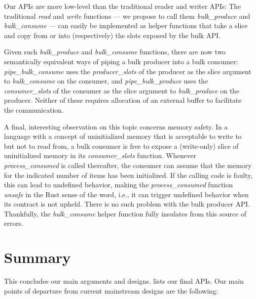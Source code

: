 \documentclass[sigplan,screen,10pt,review]{acmart}
\begin{document}
Our APIs are more low-level than the traditional reader and writer APIs: The traditional \textit{read} and \textit{write} functions --- we propose to call them \textit{bulk\_produce} and \textit{bulk\_consume} --- can easily be implemented as helper functions that take a slice and copy from or into (respectively) the slots exposed by the bulk API.

Given such \textit{bulk\_produce} and \textit{bulk\_consume} functions, there are now two semantically equivalent ways of piping a bulk producer into a bulk consumer: \textit{pipe\_bulk\_consume} uses the \textit{producer\_slots} of the producer as the slice argument to \textit{bulk\_consume} on the consumer, and \textit{pipe\_bulk\_produce} uses the \textit{consumer\_slots} of the consumer as the slice argument to \textit{bulk\_produce} on the producer. Neither of these requires allocation of an external buffer to facilitate the communication.

A final, interesting observation on this topic concerns memory safety. In a language with a concept of uninitialized memory that is acceptable to write to but not to read from, a bulk consumer is free to expose a (write-only) slice of uninitialized memory in its \textit{consumer\_slots} function. Whenever \textit{process\_consumed} is called thereafter, the consumer can assume that the memory for the indicated number of items has been initialized. If the calling code is faulty, this can lead to undefined behavior, making the \textit{process\_consumed} function \textit{unsafe} in the Rust sense of the word, i.e., it can trigger undefined behavior when its contract is not upheld. There is no such problem with the bulk producer API. Thankfully, the \textit{bulk\_consume} helper function fully insulates from this source of errors.

\section{Summary}

This concludes our main arguments and designs.  lists our final APIs. Our main points of departure from current mainstream designs are the following:
\end{document}
